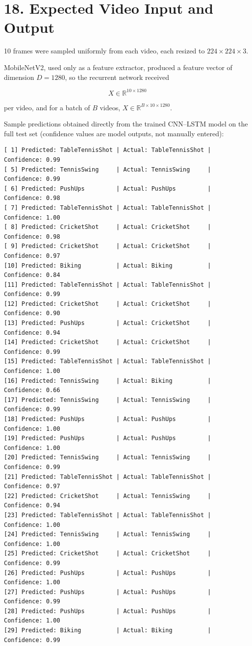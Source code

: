 \documentclass[10pt]{article}
\begin{document}
\section*{18. Expected Video Input and Output}

10 frames were sampled uniformly from each video, each resized to
$224\times224\times3$.

MobileNetV2, used only as a feature extractor, produced a feature vector of
dimension $D=1280$, so the recurrent network received

\[
X\in\mathbb{R}^{10\times1280}
\]

per video, and for a batch of $B$ videos, $X\in\mathbb{R}^{B\times10\times1280}$.

Sample predictions obtained directly from the trained CNN--LSTM model on
the full test set (confidence values are model outputs, not manually
entered):

\begin{verbatim}
[ 1] Predicted: TableTennisShot | Actual: TableTennisShot | Confidence: 0.99
[ 5] Predicted: TennisSwing     | Actual: TennisSwing     | Confidence: 0.99
[ 6] Predicted: PushUps         | Actual: PushUps         | Confidence: 0.98
[ 7] Predicted: TableTennisShot | Actual: TableTennisShot | Confidence: 1.00
[ 8] Predicted: CricketShot     | Actual: CricketShot     | Confidence: 0.98
[ 9] Predicted: CricketShot     | Actual: CricketShot     | Confidence: 0.97
[10] Predicted: Biking          | Actual: Biking          | Confidence: 0.84
[11] Predicted: TableTennisShot | Actual: TableTennisShot | Confidence: 0.99
[12] Predicted: CricketShot     | Actual: CricketShot     | Confidence: 0.90
[13] Predicted: PushUps         | Actual: CricketShot     | Confidence: 0.94
[14] Predicted: CricketShot     | Actual: CricketShot     | Confidence: 0.99
[15] Predicted: TableTennisShot | Actual: TableTennisShot | Confidence: 1.00
[16] Predicted: TennisSwing     | Actual: Biking          | Confidence: 0.66
[17] Predicted: TennisSwing     | Actual: TennisSwing     | Confidence: 0.99
[18] Predicted: PushUps         | Actual: PushUps         | Confidence: 1.00
[19] Predicted: PushUps         | Actual: PushUps         | Confidence: 1.00
[20] Predicted: TennisSwing     | Actual: TennisSwing     | Confidence: 0.99
[21] Predicted: TableTennisShot | Actual: TableTennisShot | Confidence: 0.97
[22] Predicted: CricketShot     | Actual: TennisSwing     | Confidence: 0.94
[23] Predicted: TableTennisShot | Actual: TableTennisShot | Confidence: 1.00
[24] Predicted: TennisSwing     | Actual: TennisSwing     | Confidence: 1.00
[25] Predicted: CricketShot     | Actual: CricketShot     | Confidence: 0.99
[26] Predicted: PushUps         | Actual: PushUps         | Confidence: 1.00
[27] Predicted: PushUps         | Actual: PushUps         | Confidence: 0.99
[28] Predicted: PushUps         | Actual: PushUps         | Confidence: 1.00
[29] Predicted: Biking          | Actual: Biking          | Confidence: 0.99
\end{verbatim}
\end{document}
